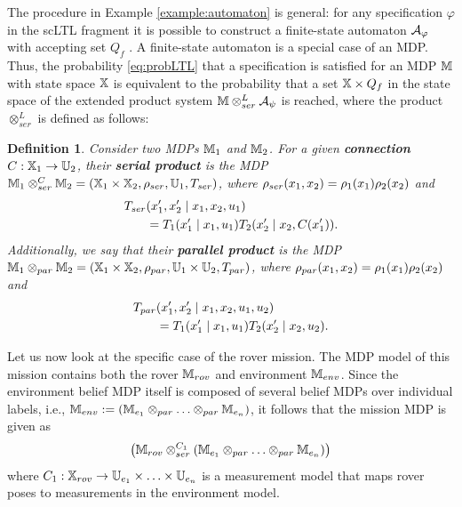 \documentclass[conference]{IEEEtran}
\renewcommand{\cite}[1]{\citep{#1}}
\newtheorem{definition}{Definition}
\begin{document}
The procedure in Example \ref{example:automaton} is general: for any specification $\varphi$ in the scLTL fragment it is possible to construct a finite-state automaton $\mathcal{A}_\varphi$ with accepting set $Q_f$ \cite{Belta2017}. A finite-state automaton is a special case of an MDP. Thus, the probability \eqref{eq:probLTL} that a specification is satisfied for an MDP $\mathbb{M}$ with state space $\mathbb{X}$ is equivalent to the probability that a set $\mathbb{X}\times Q_f$ in the state space of the extended product system $\mathbb{M} \otimes_{ser}^L \mathcal{A}_\psi$ is reached, where the product $\otimes_{ser}^L$ is defined as follows:
\begin{definition} Consider two MDPs  $\mathbb{M}_1$ and $\mathbb{M}_2$. For a given \textbf{connection} $C : \mathbb{X}_1 \rightarrow \mathbb{U}_2$, their \textbf{serial product} is the MDP $\mathbb{M}_1 \otimes_{ser}^C \mathbb{M}_2 = (\mathbb{X}_1 \times \mathbb{X}_2, \rho_{ser}, \mathbb{U}_1, T_{ser})$,
  where $\rho_{ser}(x_1, x_2) = \rho_1(x_1) \rho_2(x_2)$
  and
  \begin{equation}\label{eq:serial}
  \begin{aligned}
      \tr_{ser}&(x_1', x_2' \mid x_1, x_2, u_1) \\
      & = \tr_1 (x_1' \mid x_1, u_1) \tr_2 (x_2' \mid x_2, C(x_1') ).
  \end{aligned}
  \end{equation}
  Additionally, we say that their  \textbf{parallel product} is the MDP $\mathbb{M}_1 \otimes_{par} \mathbb{M}_2 = (\mathbb{X}_1 \times \mathbb{X}_2, \rho_{par}, \mathbb{U}_1 \times \mathbb{U}_2, T_{par})$, where $\rho_{par}(x_1, x_2) = \rho_1(x_1) \rho_2(x_2)$
  and
  \begin{equation}
  \begin{aligned}
      T_{par}&(x_1', x_2' \mid x_1, x_2, u_1, u_2) \\
      & = T_1 (x_1' \mid x_1, u_1) T_2 (x_2' \mid x_2, u_2).
  \end{aligned}
  \end{equation}
\end{definition}
 
 Let us now look at the specific case of the rover mission. The MDP model of this mission contains both the rover $\mathbb{M}_{rov}$ and environment $\mathbb{M}_{env}$. 
Since   the environment belief MDP itself is composed of several belief MDPs over individual labels, i.e., $\mathbb{M}_{env}:=\left( \mathbb{M}_{e_1} \otimes_{par} \ldots \otimes_{par} \mathbb{M}_{e_n} \right) $, it follows that the mission MDP is given as 
\begin{equation}
  \left( \mathbb{M}_{rov} \otimes_{ser}^{C_1}\left( \mathbb{M}_{e_1} \otimes_{par} \ldots \otimes_{par} \mathbb{M}_{e_n} \right) \right)
\end{equation}
where $C_1 : \mathbb{X}_{rov} \rightarrow \mathbb{U}_{e_1} \times \ldots \times \mathbb{U}_{e_n}$ is a measurement model that maps rover poses to measurements in the environment model.
 
\end{document}
